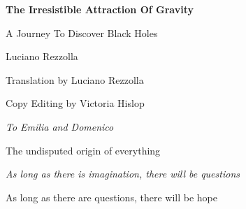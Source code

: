 \begin{titlepage}
\centering
\vspace*{1.5cm}
{\Huge\bfseries The Irresistible Attraction Of Gravity\par}
\vspace{1cm}
{\Large A Journey To Discover Black Holes\par}
\vspace{1.5cm}
{\LARGE Luciano Rezzolla\par}
\vfill
Translation by Luciano Rezzolla\par
Copy Editing by Victoria Hislop\par
\end{titlepage}
\clearpage
\thispagestyle{empty}
\vspace*{3cm}
\begin{center}\itshape
To Emilia and Domenico\par
The undisputed origin of everything\par
\end{center}
\clearpage
\thispagestyle{empty}
\vspace*{3cm}
\begin{center}\itshape
As long as there is imagination, there will be questions\par
As long as there are questions, there will be hope\par
\end{center}
\clearpage

